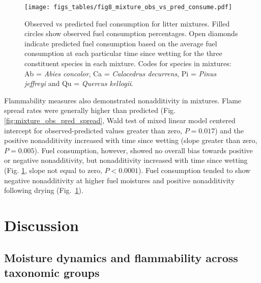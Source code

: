 \documentclass[letterpaper,12pt]{article}
\begin{document}
\begin{figure}[h]
  \centering
\texttt{[image: figs\_tables/fig8\_mixture\_obs\_vs\_pred\_consume.pdf]}
\caption{Observed vs predicted fuel consumption for litter mixtures. Filled
  circles show observed fuel consumption percentages. Open diamonds indicate
  predicted fuel consumption based on the average fuel consumption at each
  particular time since wetting for the three constituent species in each
  mixture. Codes for species in mixtures: Ab = \emph{Abies concolor}, Ca =
  \emph{Calocedrus decurrens}, Pi = \emph{Pinus jeffreyi} and Qu =
  \emph{Quercus kellogii}.}
  \label{fig:mixture_obs_pred_consume}
\end{figure}


Flammability measures also demonstrated nonadditivity in mixtures. Flame spread
rates were generally higher than predicted (Fig.
\ref{fig:mixture_obs_pred_spread}, Wald test of mixed linear model centered
intercept for observed-predicted values greater than zero, $P = 0.017$) and the
positive nonadditivity increased with time since wetting (slope greater than
zero, $P = 0.005$). Fuel consumption, however, showed no overall bias towards
positive or negative nonadditivity, but nonadditivity increased with time since
wetting (Fig. \ref{fig:mixture_obs_pred_consume}, slope not equal to zero,
$P < 0.0001$). Fuel consumption tended to show negative nonadditivity at higher
fuel moistures and positive nonadditivity following drying
(Fig.~\ref{fig:mixture_obs_pred_consume}).


\section*{Discussion}

\subsection*{Moisture dynamics and flammability across taxonomic groups}
\end{document}
